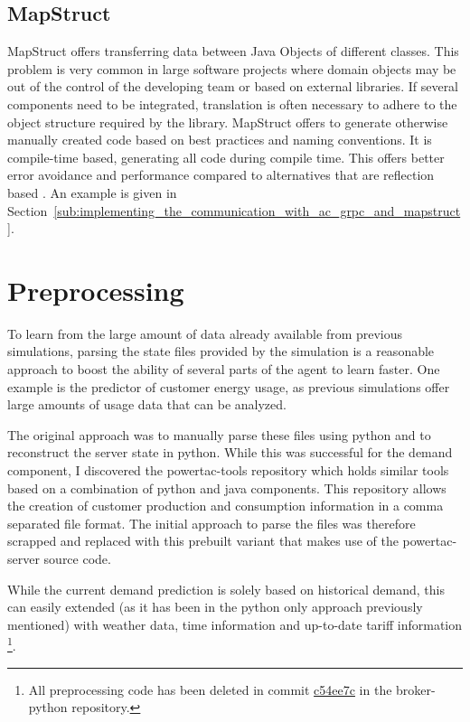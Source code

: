 \subsection{MapStruct}%
\label{sub:mapstruct}

MapStruct offers transferring data between Java Objects of different classes. This problem is very common in large
software projects where domain objects may be out of the control of the developing team or based on external libraries.
If several components need to be integrated, translation is often necessary to adhere to the object structure required
by the library. MapStruct offers to generate otherwise manually created code based on best practices and naming
conventions. It is compile-time based, generating all code during compile time. This offers better error avoidance and
performance compared to alternatives that are reflection based
\citep[]{mapstruct}.
An example is given in Section~\ref{sub:implementing_the_communication_with_ac_grpc_and_mapstruct}.




\section{Preprocessing}
\label{sec:preprocessing}

To learn from the large amount of data already available from previous simulations, parsing the state files provided by
the simulation is a reasonable approach to boost the ability of several parts of the agent to learn faster. One example
is the predictor of customer energy usage, as previous simulations offer large amounts of usage data that can be
analyzed.

The original approach was to manually parse these files using python and to reconstruct the server state in python.
While this was successful for the demand component, I discovered the powertac-tools repository which holds similar tools
based on a combination of python and java components. This repository allows the creation of customer production and
consumption information in a comma separated file format. The initial approach to parse the files was therefore scrapped
and replaced with this prebuilt variant that makes use of the powertac-server source code.

While the current demand prediction is solely based on historical demand, this can easily extended (as it has been in
the python only approach previously mentioned) with weather data, time information and up-to-date tariff information
\footnote{All preprocessing code has been deleted in commit
    \href{https://github.com/pascalwhoop/broker-python/commit/c54ee7c05585d15462f40e2be6850343e8aea27a}{c54ee7c} in the
broker-python repository.}.


